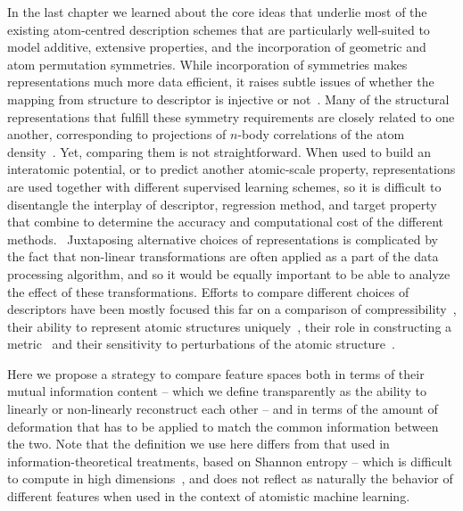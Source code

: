 In the last chapter we learned about the core ideas that underlie most of the existing atom-centred description schemes that are particularly well-suited to model additive, extensive properties, and the incorporation of geometric and atom permutation symmetries.
While incorporation of symmetries makes representations much more data efficient, it raises subtle issues of whether the mapping from structure to descriptor is injective or not~\cite{bart+13prb,vonl+15ijqc, pozd+20prl}. 
Many of the structural representations that fulfill these symmetry requirements are closely related to one another, corresponding to projections of $n$-body correlations of the atom density~\cite{will+18pccp,will+19jcp}.
Yet, comparing them is not straightforward. When used to build an interatomic potential, or to predict another atomic-scale property, representations are used together with different supervised learning schemes, so it is difficult to disentangle the interplay of descriptor, regression method, and target property that combine to determine the accuracy and computational cost of the different methods.~\cite{zuo+20jpcl}
Juxtaposing alternative choices of representations is complicated by the fact that non-linear transformations are often applied as a part of the data processing algorithm, and so it would be equally important to be able to analyze the effect of these transformations.
Efforts to compare different choices of descriptors have been mostly focused this far on a comparison of compressibility~\cite{helf+20mlst,onat+20jcp}, their ability to represent atomic structures uniquely~\cite{moussa2012comment,bart+13prb,sadeghi2013metrics,pozd+20prl}, their role in constructing a metric~\cite{zhu+16jcp,de+16pccp} and their sensitivity to perturbations of the atomic structure~\cite{pars+20mlst, onat+20jcp}.

Here we propose a strategy to compare feature spaces both in terms of their mutual information content -- which we define transparently as the ability to linearly or non-linearly reconstruct each other -- and in terms of the amount of deformation that has to be applied to match the common information between the two.
Note that the definition we use here differs from that used in information-theoretical treatments, based on Shannon entropy -- which is difficult to compute in high dimensions~\cite{torkkola2003feature}, and does not reflect as naturally the behavior of different features when used in the context of atomistic machine learning.

